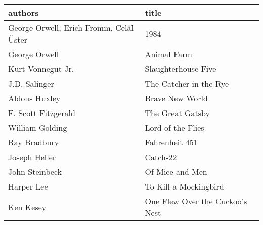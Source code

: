 \begin{tabular}{ll}
\toprule
                                 authors &                            title \\
\midrule
 George Orwell, Erich Fromm, Celâl Üster &                             1984 \\
                           George Orwell &                      Animal Farm \\
                       Kurt Vonnegut Jr. &              Slaughterhouse-Five \\
                           J.D. Salinger &           The Catcher in the Rye \\
                           Aldous Huxley &                  Brave New World \\
                     F. Scott Fitzgerald &                 The Great Gatsby \\
                         William Golding &                Lord of the Flies \\
                            Ray Bradbury &                   Fahrenheit 451 \\
                           Joseph Heller &                         Catch-22 \\
                          John Steinbeck &                  Of Mice and Men \\
                              Harper Lee &            To Kill a Mockingbird \\
                               Ken Kesey &  One Flew Over the Cuckoo's Nest \\
\bottomrule
\end{tabular}
